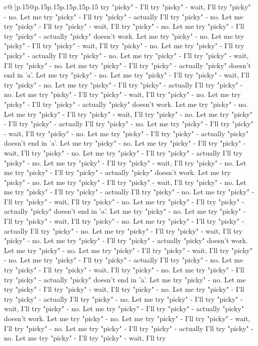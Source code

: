 \documentclass{article}
\begin{document}
{\begin{supertabular}{c@{$\;$}|p{.15\linewidth}@{}p{.15\linewidth}p{.15\linewidth}p{.15\linewidth}p{.15\linewidth}p{.15\linewidth}}
{{{try "picky" {-} I'll try "picky" {-} wait, I'll try "picky" {-} no. Let me try "picky" {-} I'll try "picky" {-} actually I'll try "picky" {-} no. Let me try "picky" {-} I'll try "picky" {-} wait, I'll try "picky" {-} no. Let me try "picky" {-} I'll try "picky" {-} actually "picky" doesn't work. Let me try "picky" {-} no. Let me try "picky" {-} I'll try "picky" {-} wait, I'll try "picky" {-} no. Let me try "picky" {-} I'll try "picky" {-} actually I'll try "picky" {-} no. Let me try "picky" {-} I'll try "picky" {-} wait, I'll try "picky" {-} no. Let me try "picky" {-} I'll try "picky" {-} actually "picky" doesn't end in 'a'. Let me try "picky" {-} no. Let me try "picky" {-} I'll try "picky" {-} wait, I'll try "picky" {-} no. Let me try "picky" {-} I'll try "picky" {-} actually I'll try "picky" {-} no. Let me try "picky" {-} I'll try "picky" {-} wait, I'll try "picky" {-} no. Let me try "picky" {-} I'll try "picky" {-} actually "picky" doesn't work. Let me try "picky" {-} no. Let me try "picky" {-} I'll try "picky" {-} wait, I'll try "picky" {-} no. Let me try "picky" {-} I'll try "picky" {-} actually I'll try "picky" {-} no. Let me try "picky" {-} I'll try "picky" {-} wait, I'll try "picky" {-} no. Let me try "picky" {-} I'll try "picky" {-} actually "picky" doesn't end in 'a'. Let me try "picky" {-} no. Let me try "picky" {-} I'll try "picky" {-} wait, I'll try "picky" {-} no. Let me try "picky" {-} I'll try "picky" {-} actually I'll try "picky" {-} no. Let me try "picky" {-} I'll try "picky" {-} wait, I'll try "picky" {-} no. Let me try "picky" {-} I'll try "picky" {-} actually "picky" doesn't work. Let me try "picky" {-} no. Let me try "picky" {-} I'll try "picky" {-} wait, I'll try "picky" {-} no. Let me try "picky" {-} I'll try "picky" {-} actually I'll try "picky" {-} no. Let me try "picky" {-} I'll try "picky" {-} wait, I'll try "picky" {-} no. Let me try "picky" {-} I'll try "picky" {-} actually "picky" doesn't end in 'a'. Let me try "picky" {-} no. Let me try "picky" {-} I'll try "picky" {-} wait, I'll try "picky" {-} no. Let me try "picky" {-} I'll try "picky" {-} actually I'll try "picky" {-} no. Let me try "picky" {-} I'll try "picky" {-} wait, I'll try "picky" {-} no. Let me try "picky" {-} I'll try "picky" {-} actually "picky" doesn't work. Let me try "picky" {-} no. Let me try "picky" {-} I'll try "picky" {-} wait, I'll try "picky" {-} no. Let me try "picky" {-} I'll try "picky" {-} actually I'll try "picky" {-} no. Let me try "picky" {-} I'll try "picky" {-} wait, I'll try "picky" {-} no. Let me try "picky" {-} I'll try "picky" {-} actually "picky" doesn't end in 'a'. Let me try "picky" {-} no. Let me try "picky" {-} I'll try "picky" {-} wait, I'll try "picky" {-} no. Let me try "picky" {-} I'll try "picky" {-} actually I'll try "picky" {-} no. Let me try "picky" {-} I'll try "picky" {-} wait, I'll try "picky" {-} no. Let me try "picky" {-} I'll try "picky" {-} actually "picky" doesn't work. Let me try "picky" {-} no. Let me try "picky" {-} I'll try "picky" {-} wait, I'll try "picky" {-} no. Let me try "picky" {-} I'll try "picky" {-} actually I'll try "picky" {-} no. Let me try "picky" {-} I'll try "picky" {-} wait, I'll try }}}
\end{supertabular}}
\end{document}
